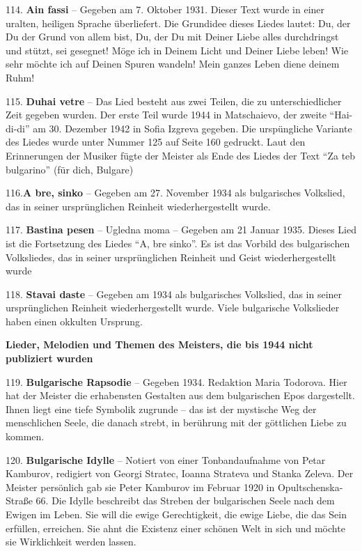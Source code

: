 \documentclass[11pt,a5paper,twoside]{article}
\begin{document}
114. \textbf{Ain fassi} -- Gegeben am 7. Oktober 1931.  Dieser Text wurde in einer uralten, heiligen Sprache überliefert. Die Grundidee dieses Liedes lautet: Du, der Du der Grund von allem bist, Du, der Du mit Deiner Liebe alles durchdringst und stützt, sei gesegnet! Möge ich in Deinem Licht und Deiner Liebe leben! Wie sehr möchte ich auf Deinen Spuren wandeln! Mein ganzes Leben diene deinem Ruhm!

115. \textbf{Duhai vetre} -- Das Lied besteht aus zwei Teilen, die zu unterschiedlicher Zeit gegeben wurden. Der erste Teil wurde 1944 in Matschaievo, der zweite "`Hai-di-di"' am 30. Dezember 1942 in Sofia Izgreva gegeben. Die urspüngliche Variante des Liedes wurde unter Nummer 125 auf Seite 160 gedruckt. Laut den Erinnerungen der Musiker fügte der Meister als Ende des Liedes der Text "`Za teb bulgarino"' (für dich, Bulgare)
 
116.\textbf{A bre, sinko} --  Gegeben am 27. November 1934 als bulgarisches Volkslied, das in seiner ursprünglichen Reinheit wiederhergestellt wurde.

117. \textbf{Bastina pesen} -- Ugledna moma -- Gegeben am 21 Januar 1935. Dieses Lied ist die Fortsetzung des Liedes "`A, bre sinko"'. Es ist das Vorbild des bulgarischen Volksliedes, das in seiner ursprünglichen Reinheit und Geist wiederhergestellt wurde

118. \textbf{Stavai daste} -- Gegeben am 1934 als bulgarisches Volkslied, das in seiner ursprünglichen Reinheit wiederhergestellt wurde. Viele bulgarische Volkslieder haben einen okkulten Ursprung.

\begin{center}
\textbf{Lieder, Melodien und Themen des Meisters, die bis 1944 nicht publiziert wurden}
\end{center}

119. \textbf{Bulgarische Rapsodie} -- Gegeben 1934. Redaktion Maria Todorova. Hier hat der Meister die erhabensten Gestalten aus dem bulgarischen Epos dargestellt. Ihnen liegt eine tiefe Symbolik zugrunde -- das ist der mystische Weg der menschlichen Seele, die danach strebt, in berührung mit der göttlichen Liebe zu kommen.

120. \textbf{Bulgarische Idylle} -- Notiert von einer Tonbandaufnahme von Petar Kamburov, redigiert von Georgi Stratec, Ioanna Strateva und Stanka Zeleva. Der Meister persönlich gab sie Peter Kamburov im Februar 1920 in Opultschenska-Straße 66. Die Idylle beschreibt das Streben der bulgarischen Seele nach dem Ewigen im Leben. Sie will die ewige Gerechtigkeit, die ewige Liebe, die das Sein erfüllen, erreichen. Sie ahnt die Existenz einer schönen Welt in sich und möchte sie Wirklichkeit werden lassen.
\end{document}
